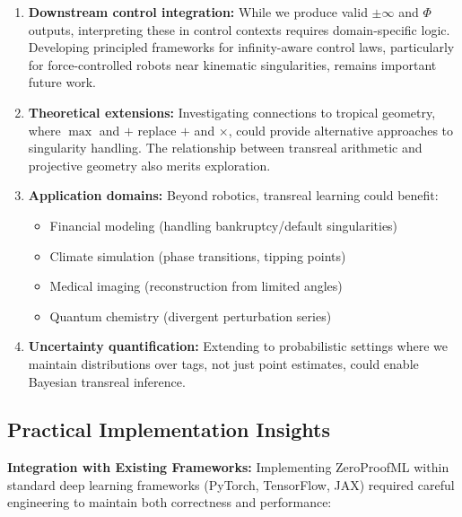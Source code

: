 \documentclass[twoside,11pt]{article}
\begin{document}
\begin{enumerate}
\item \textbf{Downstream control integration:} While we produce valid $\pm\infty$ and $\Phi$ outputs, interpreting these in control contexts requires domain-specific logic. Developing principled frameworks for infinity-aware control laws, particularly for force-controlled robots near kinematic singularities, remains important future work.

\item \textbf{Theoretical extensions:} Investigating connections to tropical geometry, where $\max$ and $+$ replace $+$ and $\times$, could provide alternative approaches to singularity handling. The relationship between transreal arithmetic and projective geometry also merits exploration.

\item \textbf{Application domains:} Beyond robotics, transreal learning could benefit:
\begin{itemize}
   \item Financial modeling (handling bankruptcy/default singularities)
   \item Climate simulation (phase transitions, tipping points)
   \item Medical imaging (reconstruction from limited angles)
   \item Quantum chemistry (divergent perturbation series)
\end{itemize}

\item \textbf{Uncertainty quantification:} Extending to probabilistic settings where we maintain distributions over tags, not just point estimates, could enable Bayesian transreal inference.
\end{enumerate}
\subsection{Practical Implementation Insights}

\textbf{Integration with Existing Frameworks:}
Implementing ZeroProofML within standard deep learning frameworks (PyTorch, TensorFlow, JAX) required careful engineering to maintain both correctness and performance:
\end{document}

